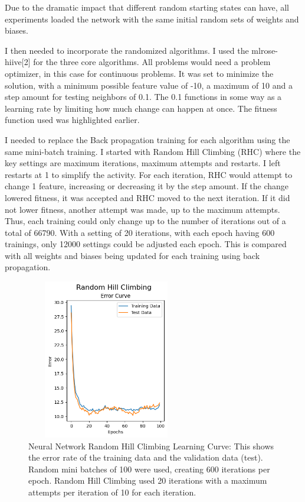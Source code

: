 \documentclass[letterpaper]{article} %
\begin{document}
Due to the dramatic impact that different random starting states can have, all experiments loaded the network with the same initial random sets of weights and biases.

I then needed to incorporate the randomized algorithms. I used the mlrose-hiive[2] for the three core algorithms.  All problems would need a problem optimizer, in this case for continuous problems. It was set to minimize the solution, with a minimum possible feature value of -10, a maximum of 10 and a step amount for testing neighbors of 0.1.  The 0.1 functions in some way as a learning rate by limiting how much change can happen at once.  The fitness function used was highlighted earlier.

I needed to replace the Back propagation training for each algorithm using the same mini-batch training. I started with Random Hill Climbing (RHC) where the key settings are maximum iterations, maximum attempts and restarts.  I left restarts at 1 to simplify the activity.  For each iteration, RHC would attempt to change 1 feature, increasing or decreasing it by the step amount.  If the change lowered fitness, it was accepted and RHC moved to the next iteration.  If it did not lower fitness, another attempt was made, up to the maximum attempts.  Thus, each training could only change up to the number of iterations out of a total of 66790.  With a setting of 20 iterations, with each epoch having 600 trainings, only 12000 settings could be adjusted each epoch.  This is compared with all weights and biases being updated for each training using back propagation.

\begin{figure}[!htb]
\centering
\includegraphics[width=2.75in, height=2.75in]{figures/Random_Hill_Climbing__algorithm_rhc_epochs_100_restart_1_max_iters_20_max_attempts_10_seed_1_capture_iteration_values_False_Error_Curve.png}
\caption{Neural Network Random Hill Climbing Learning Curve: This shows the error rate of the training data and the validation data (test).  Random mini batches of 100 were used, creating 600 iterations per epoch.  Random Hill Climbing used 20 iterations with a maximum attempts per iteration of 10 for each iteration.  }
\label{fig:nn_rhc_initial}
\end{figure}
\end{document}
